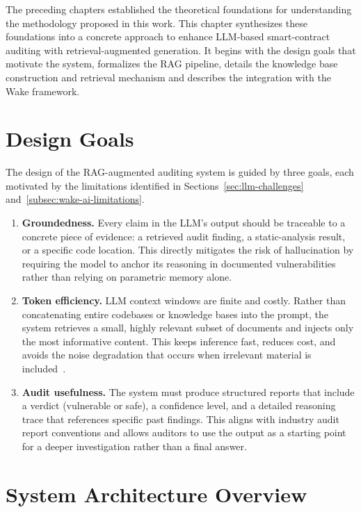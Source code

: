 The preceding chapters established the theoretical foundations for understanding the methodology proposed in this work. This chapter synthesizes these foundations into a concrete approach to enhance LLM-based smart-contract auditing with retrieval-augmented generation. It begins with the design goals that motivate the system, formalizes the RAG pipeline, details the knowledge base construction and retrieval mechanism and describes the integration with the Wake framework.

\section{Design Goals}
\label{sec:design-goals}

The design of the RAG-augmented auditing system is guided by three goals, each motivated by the limitations identified in Sections~\ref{sec:llm-challenges} and~\ref{subsec:wake-ai-limitations}.

\begin{enumerate}
    \item \textbf{Groundedness.} Every claim in the LLM's output should be traceable to a concrete piece of evidence: a retrieved audit finding, a static-analysis result, or a specific code location. This directly mitigates the risk of hallucination by requiring the model to anchor its reasoning in documented vulnerabilities rather than relying on parametric memory alone.

    \item \textbf{Token efficiency.} LLM context windows are finite and costly. Rather than concatenating entire codebases or knowledge bases into the prompt, the system retrieves a small, highly relevant subset of documents and injects only the most informative content. This keeps inference fast, reduces cost, and avoids the noise degradation that occurs when irrelevant material is included~\cite{lewis2021retrieval}.

    \item \textbf{Audit usefulness.} The system must produce structured reports that include a verdict (vulnerable or safe), a confidence level, and a detailed reasoning trace that references specific past findings. This aligns with industry audit report conventions and allows auditors to use the output as a starting point for a deeper investigation rather than a final answer.
\end{enumerate}

\section{System Architecture Overview}
\label{sec:system-architecture}

